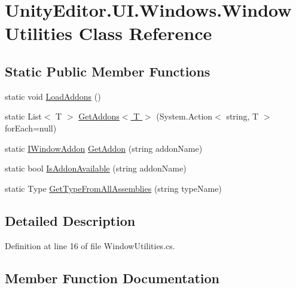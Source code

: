 \hypertarget{class_unity_editor_1_1_u_i_1_1_windows_1_1_window_utilities}{}\section{Unity\+Editor.\+U\+I.\+Windows.\+Window\+Utilities Class Reference}
\label{class_unity_editor_1_1_u_i_1_1_windows_1_1_window_utilities}
\subsection*{Static Public Member Functions}
\begin{DoxyCompactItemize}
\item 
static void \hyperlink{class_unity_editor_1_1_u_i_1_1_windows_1_1_window_utilities_aa24c4266c3d32c6cbd49ee3a6b530d31}{Load\+Addons} ()
\item 
static List$<$ T $>$ \hyperlink{class_unity_editor_1_1_u_i_1_1_windows_1_1_window_utilities_a8eb95e11e143d87422ae73e407990a8b}{Get\+Addons$<$ T $>$} (System.\+Action$<$ string, T $>$ for\+Each=null)
\item 
static \hyperlink{interface_unity_editor_1_1_u_i_1_1_windows_1_1_i_window_addon}{I\+Window\+Addon} \hyperlink{class_unity_editor_1_1_u_i_1_1_windows_1_1_window_utilities_ac1144a79a16b745ffdfcf023826db7d6}{Get\+Addon} (string addon\+Name)
\item 
static bool \hyperlink{class_unity_editor_1_1_u_i_1_1_windows_1_1_window_utilities_aed54f600ae003a102f56d95f0b070237}{Is\+Addon\+Available} (string addon\+Name)
\item 
static Type \hyperlink{class_unity_editor_1_1_u_i_1_1_windows_1_1_window_utilities_a192b5ee9f6a13cc76a0f3773a85e545f}{Get\+Type\+From\+All\+Assemblies} (string type\+Name)
\end{DoxyCompactItemize}


\subsection{Detailed Description}


Definition at line 16 of file Window\+Utilities.\+cs.



\subsection{Member Function Documentation}
\hypertarget{class_unity_editor_1_1_u_i_1_1_windows_1_1_window_utilities_ac1144a79a16b745ffdfcf023826db7d6}{}
